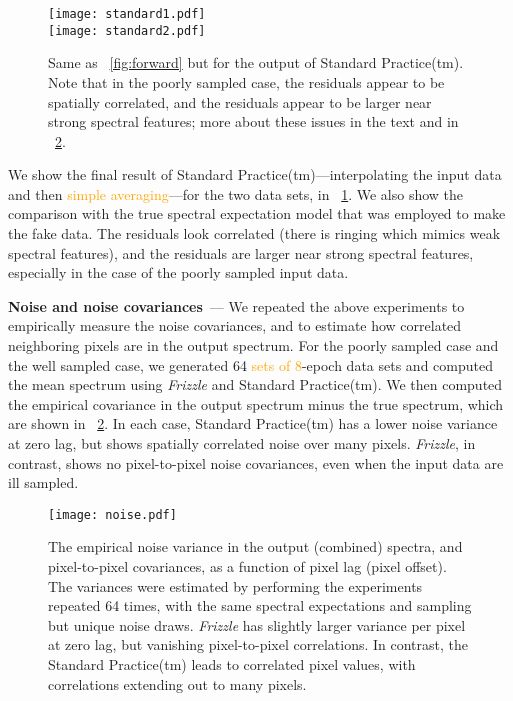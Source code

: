 \documentclass[modern, linenumbers]{aastex631}
\renewcommand{\paragraph}[1]{\medskip\par\noindent\textbf{#1}~---}
\newlength{\figurewidth}
\newcommand{\name}{\textsl{Frizzle}}
\newcommand{\modified}[1]{\textcolor{orange}{#1}}
\begin{document}
\begin{figure}[t!]
    \begin{mdframed}\begin{center}
    \texttt{[image: standard1.pdf]}\\
    \texttt{[image: standard2.pdf]}
    \end{center}
    \caption{Same as \figurename~\ref{fig:forward} but for the output of Standard Practice(tm). Note that in the poorly sampled case, the residuals appear to be spatially correlated, and the residuals appear to be larger near strong spectral features; more about these issues in the text and in \figurename~\ref{fig:noise}.\label{fig:standard}}
    \end{mdframed}
\end{figure}
We show the final result of Standard Practice(tm)---interpolating the input data and then \modified{simple averaging}---for the two data sets, in \figurename~\ref{fig:standard}.
We also show the comparison with the true spectral expectation model that was employed to make the fake data.
The residuals look correlated (there is ringing which mimics weak spectral features), and the residuals are larger near strong spectral features, especially in the case of the poorly sampled input data.

\paragraph{Noise and noise covariances}
We repeated the above experiments to empirically measure the noise covariances, and to estimate how correlated neighboring pixels are in the output spectrum. For the poorly sampled case and the well sampled case, we generated 64 \modified{sets of 8}-epoch data sets and computed the mean spectrum using \name{} and Standard Practice(tm). We then computed the empirical covariance in the output spectrum minus the true spectrum, which are shown in \figurename~\ref{fig:noise}.
In each case, Standard Practice(tm) has a lower noise variance at zero lag, but shows spatially correlated noise over many pixels.
\name{}, in contrast, shows no pixel-to-pixel noise covariances, even when the input data are ill sampled.
\begin{figure}[t!]
    \begin{mdframed}\begin{center}
    \texttt{[image: noise.pdf]}
    \end{center}
    \caption{The empirical noise variance in the output (combined) spectra, and pixel-to-pixel covariances, as a function of pixel lag (pixel offset). The variances were estimated by performing the experiments repeated 64 times, with the same spectral expectations and sampling but unique noise draws. \name{} has slightly larger variance per pixel at zero lag, but vanishing pixel-to-pixel correlations. In contrast, the Standard Practice(tm) leads to correlated pixel values, with correlations extending out to many pixels.\label{fig:noise}}
    \end{mdframed}
\end{figure}
\end{document}

